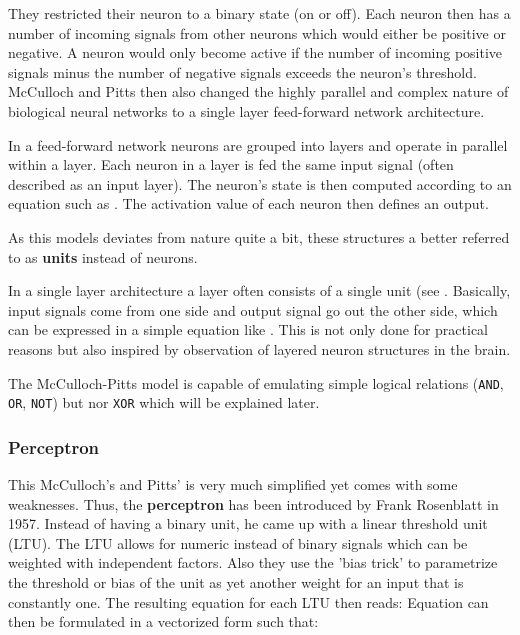 They restricted their neuron to a binary state (on or off).
Each neuron then has a number of incoming signals from other neurons which would either be positive or negative.
A neuron would only become active if the number of incoming positive signals minus the number of negative signals exceeds the neuron's threshold.
McCulloch and Pitts then also changed the highly parallel and complex nature of biological neural networks to a single layer feed-forward network architecture.

In a feed-forward network neurons are grouped into layers and operate in parallel within a layer.
Each neuron in a layer is fed the same input signal (often described as an input layer).
The neuron's state is then computed according to an equation such as .
The activation value of each neuron then defines an output.

As this models deviates from nature quite a bit, these structures a better referred to as \textbf{units} instead of neurons.

In a single layer architecture a layer often consists of a single unit (see .
Basically, input signals come from one side and output signal go out the other side, which can be expressed in a simple equation like .
This is not only done for practical reasons but also inspired by observation of layered neuron structures in the brain.

The McCulloch-Pitts model is capable of emulating simple logical relations (\lstinline|AND|, \lstinline|OR|, \lstinline|NOT|) but nor \lstinline|XOR| which will be explained later.

\subsubsection{Perceptron}
This McCulloch's and Pitts' is very much simplified yet comes with some weaknesses.
Thus, the \textbf{perceptron} has been introduced by Frank Rosenblatt in 1957.
Instead of having a binary unit, he came up with a linear threshold unit (LTU).
The LTU allows for numeric instead of binary signals which can be weighted with independent factors.
Also they use the 'bias trick' to parametrize the threshold or bias of the unit as yet another weight for an input that is constantly one.
The resulting equation for each LTU then reads:
Equation  can then be formulated in a vectorized form such that:


